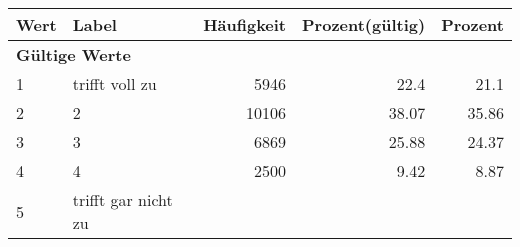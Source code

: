      \begin{longtable}{lXrrr}
     \toprule
     \textbf{Wert} & \textbf{Label} & \textbf{Häufigkeit} & \textbf{Prozent(gültig)} & \textbf{Prozent} \\
     \endhead
     \midrule
     \multicolumn{5}{l}{\textbf{Gültige Werte}}\\

     1 &
     \multicolumn{1}{X}{ trifft voll zu   } &


       \num{5946} &
       \num[round-mode=places,round-precision=2]{22,4} &
         \num[round-mode=places,round-precision=2]{21,1} \\

     2 &
     \multicolumn{1}{X}{ 2   } &


       \num{10106} &
       \num[round-mode=places,round-precision=2]{38,07} &
         \num[round-mode=places,round-precision=2]{35,86} \\

     3 &
     \multicolumn{1}{X}{ 3   } &


       \num{6869} &
       \num[round-mode=places,round-precision=2]{25,88} &
         \num[round-mode=places,round-precision=2]{24,37} \\

     4 &
     \multicolumn{1}{X}{ 4   } &


       \num{2500} &
       \num[round-mode=places,round-precision=2]{9,42} &
         \num[round-mode=places,round-precision=2]{8,87} \\

     5 &
     \multicolumn{1}{X}{ trifft gar nicht zu   } &



\end{longtable}
